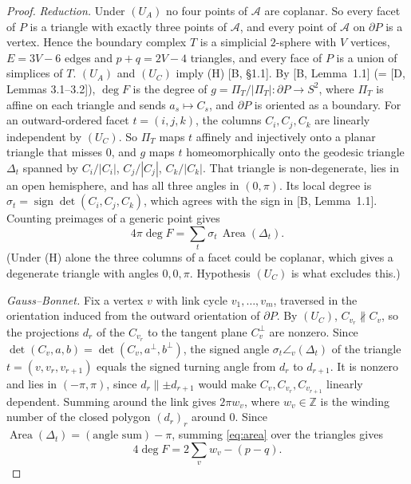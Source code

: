 \documentclass[11pt]{amsart}
\theoremstyle{remark}
\DeclareMathOperator{\sign}{sign}
\newcommand{\A}{\mathcal A}
\begin{document}
\begin{proof}
\emph{Reduction.}
Under $(U_A)$ no four points of $\A$ are coplanar.
So every facet of $P$ is a triangle with exactly three points of $\A$, and every point of $\A$ on $\partial P$ is a vertex.
Hence the boundary complex $T$ is a simplicial $2$-sphere with $V$ vertices, $E=3V-6$ edges and $p+q=2V-4$ triangles, and every face of $P$ is a union of simplices of $T$.
$(U_A)$ and $(U_C)$ imply (H) [B, \S1.1].
By [B, Lemma~1.1] (= [D, Lemmas 3.1--3.2]), $\deg F$ is the degree of $g=\Pi_T/|\Pi_T|\colon\partial P\to S^2$, where $\Pi_T$ is affine on each triangle and sends $a_s\mapsto C_s$, and $\partial P$ is oriented as a boundary.
For an outward-ordered facet $t=(i,j,k)$, the columns $C_i,C_j,C_k$ are linearly independent by $(U_C)$.
So $\Pi_T$ maps $t$ affinely and injectively onto a planar triangle that misses $0$, and $g$ maps $t$ homeomorphically onto the geodesic triangle $\Delta_t$ spanned by $C_i/|C_i|$, $C_j/|C_j|$, $C_k/|C_k|$.
That triangle is non-degenerate, lies in an open hemisphere, and has all three angles in $(0,\pi)$.
Its local degree is $\sigma_t=\sign\det(C_i,C_j,C_k)$, which agrees with the sign in [B, Lemma~1.1].
Counting preimages of a generic point gives
\begin{equation}\label{eq:area}
4\pi\deg F=\sum_t\sigma_t\,\operatorname{Area}(\Delta_t).
\end{equation}
(Under (H) alone the three columns of a facet could be coplanar, which gives a degenerate triangle with angles $0,0,\pi$. Hypothesis $(U_C)$ is what excludes this.)

\emph{Gauss--Bonnet.}
Fix a vertex $v$ with link cycle $v_1,\dots,v_m$, traversed in the orientation induced from the outward orientation of $\partial P$.
By $(U_C)$, $C_{v_r}\not\parallel C_v$, so the projections $d_r$ of the $C_{v_r}$ to the tangent plane $C_v^\perp$ are nonzero.
Since $\det(C_v,a,b)=\det(C_v,a^\perp,b^\perp)$, the signed angle $\sigma_t\angle_v(\Delta_t)$ of the triangle $t=(v,v_r,v_{r+1})$ equals the signed turning angle from $d_r$ to $d_{r+1}$.
It is nonzero and lies in $(-\pi,\pi)$, since $d_r\parallel\pm d_{r+1}$ would make $C_v,C_{v_r},C_{v_{r+1}}$ linearly dependent.
Summing around the link gives $2\pi w_v$, where $w_v\in\mathbb Z$ is the winding number of the closed polygon $(d_r)_r$ around $0$.
Since $\operatorname{Area}(\Delta_t)=(\text{angle sum})-\pi$, summing \eqref{eq:area} over the triangles gives
\begin{equation}\label{eq:gb}
4\deg F=2\sum_v w_v-(p-q).
\end{equation}


\end{proof}
\end{document}
